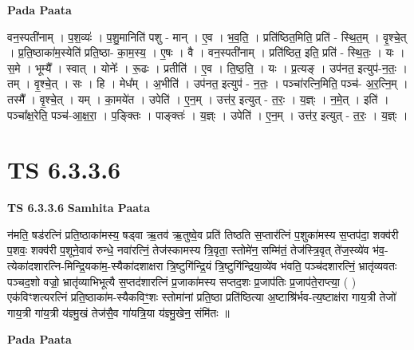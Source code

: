 \documentclass[17pt]{extarticle}
\begin{document}
\textbf{Pada Paata} \newline

वन॒स्पती॑नाम् । प॒श॒व्यः॑ । प॒शु॒मानिति॑ पशु - मान् । ए॒व । भ॒व॒ति॒ । प्रति॑ष्ठित॒मिति॒ प्रति॑ - स्थि॒त॒म् । वृ॒श्चे॒त् । प्र॒ति॒ष्ठाका॑म॒स्येति॑ प्रति॒ष्ठा- का॒म॒स्य॒ । ए॒षः । वै । वन॒स्पती॑नाम् । प्रति॑ष्ठित॒ इति॒ प्रति॑ - स्थि॒तः॒ । यः । स॒मे । भूम्यै᳚ । स्वात् । योनेः᳚ । रू॒ढः । प्रतीति॑ । ए॒व । ति॒ष्ठ॒ति॒ । यः । प्र॒त्यङ् । उप॑नत॒ इत्युप॑-न॒तः॒ । तम् । वृ॒श्चे॒त् । सः । हि । मेध᳚म् । अ॒भीति॑ । उप॑नत॒ इत्युप॑ - न॒तः॒ । पञ्चा॑रत्नि॒मिति॒ पञ्च॑- अ॒र॒त्नि॒म् । तस्मै᳚ । वृ॒श्चे॒त् । यम् । का॒मये॑त । उपेति॑ । ए॒न॒म् । उत्त॑र॒ इत्युत् - त॒रः॒ । य॒ज्ञ्ः । न॒मे॒त् । इति॑ । पञ्चा᳚क्ष॒रेति॒ पञ्च॑-आ॒क्ष॒रा॒ । प॒ङ्क्तिः । पाङ्क्तः॑ । य॒ज्ञ्ः । उपेति॑ । ए॒न॒म् । उत्त॑र॒ इत्युत् - त॒रः॒ । य॒ज्ञ्ः ।  \newline




\section*{ TS 6.3.3.6 }

\textbf{TS 6.3.3.6 } \newline
\textbf{Samhita Paata} \newline

न॑मति॒ षड॑रत्निं प्रति॒ष्ठाका॑मस्य॒ षड्वा ऋ॒तव॑ ऋ॒तुष्वे॒व प्रति॑ तिष्ठति स॒प्तार॑त्निं प॒शुका॑मस्य स॒प्तप॑दा॒ शक्व॑री प॒शवः॒ शक्व॑री प॒शूने॒वाव॑ रुन्धे॒ नवा॑रत्निं॒ तेज॑स्कामस्य त्रि॒वृता॒ स्तोमे॑न॒ सम्मि॑तं॒ तेज॑स्त्रि॒वृत् ते॑ज॒स्व्ये॑व भ॑व॒-त्येका॑दशारत्नि-मिन्द्रि॒यका॑म॒-स्यैका॑दशाक्षरा त्रि॒ष्टुगि॑न्द्रि॒यं त्रि॒ष्टुगि॑न्द्रिया॒व्ये॑व भ॑वति॒ पञ्च॑दशारत्निं॒ भ्रातृ॑व्यवतः पञ्चद॒शो वज्रो॒ भ्रातृ॑व्याभिभूत्यै स॒प्तद॑शारत्निं प्र॒जाका॑मस्य सप्तद॒शः प्र॒जाप॑तिः प्र॒जाप॑ते॒राप्त्या॒ ( ) एक॑विꣳशत्यरत्निं प्रति॒ष्ठाका॑म-स्यैकविꣳ॒॒शः स्तोमा॑नां प्रति॒ष्ठा प्रति॑ष्ठित्या अ॒ष्टाश्रि॑र्भव-त्य॒ष्टाक्ष॑रा गाय॒त्री तेजो॑ गाय॒त्री गा॑य॒त्री य॑ज्ञ्मु॒खं तेज॑सै॒व गा॑यत्रि॒या य॑ज्ञ्मु॒खेन॒ संमि॑तः ॥ \newline

\textbf{Pada Paata} \newline
\end{document}
